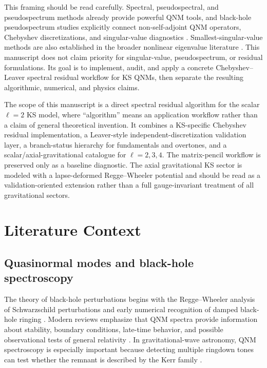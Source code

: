 \documentclass[10pt,letterpaper,twocolumn]{article}
\begin{document}
This framing should be read carefully. Spectral, pseudospectral, and pseudospectrum methods already provide powerful QNM tools, and black-hole pseudospectrum studies explicitly connect non-self-adjoint QNM operators, Chebyshev discretizations, and singular-value diagnostics \cite{Jansen2017,Jaramillo2021,Cao2024}. Smallest-singular-value methods are also established in the broader nonlinear eigenvalue literature \cite{Sadkane2023}. This manuscript does not claim priority for singular-value, pseudospectrum, or residual formulations. Its goal is to implement, audit, and apply a concrete Chebyshev--Leaver spectral residual workflow for KS QNMs, then separate the resulting algorithmic, numerical, and physics claims.

The scope of this manuscript is a direct spectral residual algorithm for the scalar \(\ell=2\) KS model, where ``algorithm'' means an application workflow rather than a claim of general theoretical invention. It combines a KS-specific Chebyshev residual implementation, a Leaver-style independent-discretization validation layer, a branch-status hierarchy for fundamentals and overtones, and a scalar/axial-gravitational catalogue for \(\ell=2,3,4\). The matrix-pencil workflow is preserved only as a baseline diagnostic. The axial gravitational KS sector is modeled with a lapse-deformed Regge--Wheeler potential and should be read as a validation-oriented extension rather than a full gauge-invariant treatment of all gravitational sectors.

\section{Literature Context}

\subsection{Quasinormal modes and black-hole spectroscopy}

The theory of black-hole perturbations begins with the Regge--Wheeler analysis of Schwarzschild perturbations \cite{Regge1957} and early numerical recognition of damped black-hole ringing \cite{Vishveshwara1970}. Modern reviews emphasize that QNM spectra provide information about stability, boundary conditions, late-time behavior, and possible observational tests of general relativity \cite{Kokkotas1999,Berti2009,Konoplya2011}. In gravitational-wave astronomy, QNM spectroscopy is especially important because detecting multiple ringdown tones can test whether the remnant is described by the Kerr family \cite{Berti2006,Isi2019}.
\end{document}
